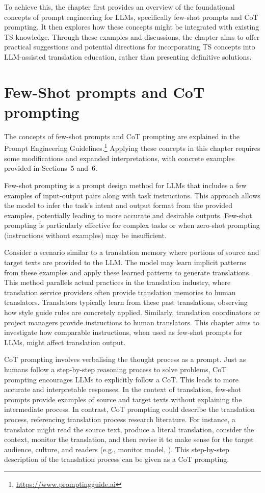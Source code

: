 \documentclass[output=paper,colorlinks,citecolor=brown, japanesefont]{langscibook}
\begin{document}
To achieve this, the chapter first provides an overview of the foundational concepts of prompt engineering for LLMs, specifically few-shot prompts and CoT prompting. It then explores how these concepts might be integrated with existing TS knowledge. Through these examples and discussions, the chapter aims to offer practical suggestions and potential directions for incorporating TS concepts into LLM-assisted translation education, rather than presenting definitive solutions.

\section{Few-Shot prompts and CoT prompting}
The concepts of few-shot prompts and CoT prompting are explained in the Prompt Engineering Guidelines.\footnote{\url{ https://www.promptingguide.ai}} Applying these concepts in this chapter requires some modifications and expanded interpretations, with concrete examples provided in Sections~5 and~6.

Few-shot prompting is a prompt design method for LLMs that includes a few examples of input-output pairs along with task instructions. This approach allows the model to infer the task's intent and output format from the provided examples, potentially leading to more accurate and desirable outputs. Few-shot prompting is particularly effective for complex tasks or when zero-shot prompting (instructions without examples) may be insufficient.

Consider a scenario similar to a translation memory where portions of source and target texts are provided to the LLM. The model may learn implicit patterns from these examples and apply these learned patterns to generate translations. This method parallels actual practices in the translation industry, where translation service providers often provide translation memories to human translators. Translators typically learn from these past translations, observing how style guide rules are concretely applied. Similarly, translation coordinators or project managers provide instructions to human translators. This chapter aims to investigate how comparable instructions, when used as few-shot prompts for LLMs, might affect translation output.

CoT prompting involves verbalising the thought process as a prompt. Just as humans follow a step-by-step reasoning process to solve problems, CoT prompting encourages LLMs to explicitly follow a CoT. This leads to more accurate and interpretable responses.
In the context of translation, few-shot prompts provide examples of source and target texts without explaining the intermediate process. In contrast, CoT prompting could describe the translation process, referencing translation process research literature. For instance, a translator might read the source text, produce a literal translation, consider the context, monitor the translation, and then revise it to make sense for the target audience, culture, and readers (e.g., monitor model, \citealt{Tirkkone-Condit2005}). This step-by-step description of the translation process can be given as a CoT prompting.
\end{document}
